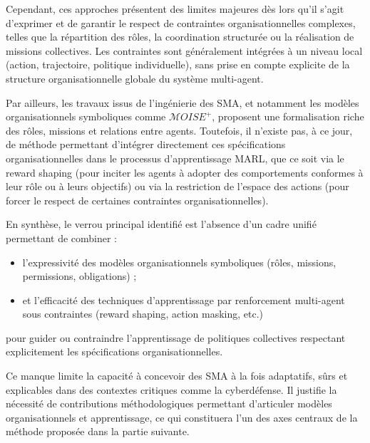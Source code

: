 Cependant, ces approches présentent des limites majeures dès lors qu’il s’agit d’exprimer et de garantir le respect de contraintes organisationnelles complexes, telles que la répartition des rôles, la coordination structurée ou la réalisation de missions collectives. Les contraintes sont généralement intégrées à un niveau local (action, trajectoire, politique individuelle), sans prise en compte explicite de la structure organisationnelle globale du système multi-agent.

Par ailleurs, les travaux issus de l’ingénierie des SMA, et notamment les modèles organisationnels symboliques comme $\mathcal{M}OISE^+$, proposent une formalisation riche des rôles, missions et relations entre agents. Toutefois, il n’existe pas, à ce jour, de méthode permettant d’intégrer directement ces spécifications organisationnelles dans le processus d’apprentissage MARL, que ce soit via le reward shaping (pour inciter les agents à adopter des comportements conformes à leur rôle ou à leurs objectifs) ou via la restriction de l’espace des actions (pour forcer le respect de certaines contraintes organisationnelles).

En synthèse, le verrou principal identifié est l’absence d’un cadre unifié permettant de combiner :
\begin{itemize}
  \item l’expressivité des modèles organisationnels symboliques (rôles, missions, permissions, obligations) ;
  \item et l’efficacité des techniques d’apprentissage par renforcement multi-agent sous contraintes (reward shaping, action masking, etc.)
\end{itemize}
pour guider ou contraindre l’apprentissage de politiques collectives respectant explicitement les spécifications organisationnelles.

Ce manque limite la capacité à concevoir des SMA à la fois adaptatifs, sûrs et explicables dans des contextes critiques comme la cyberdéfense. Il justifie la nécessité de contributions méthodologiques permettant d’articuler modèles organisationnels et apprentissage, ce qui constituera l’un des axes centraux de la méthode proposée dans la partie suivante.




